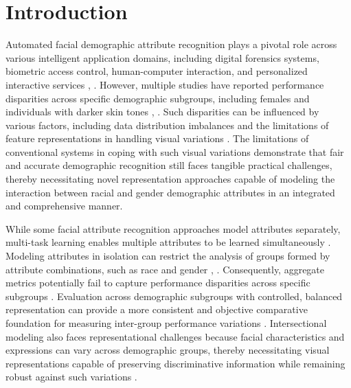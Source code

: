 \section{Introduction}
\label{sec:introduction}

Automated facial demographic attribute recognition plays a pivotal role across various intelligent application domains, including digital forensics systems, biometric access control, human-computer interaction, and personalized interactive services \cite{ref1}, \cite{ref2}. However, multiple studies have reported performance disparities across specific demographic subgroups, including females and individuals with darker skin tones \cite{ref3}, \cite{ref4}. Such disparities can be influenced by various factors, including data distribution imbalances and the limitations of feature representations in handling visual variations \cite{ref5}. The limitations of conventional systems in coping with such visual variations demonstrate that fair and accurate demographic recognition still faces tangible practical challenges, thereby necessitating novel representation approaches capable of modeling the interaction between racial and gender demographic attributes in an integrated and comprehensive manner.

While some facial attribute recognition approaches model attributes separately, multi-task learning enables multiple attributes to be learned simultaneously \cite{ref6}. Modeling attributes in isolation can restrict the analysis of groups formed by attribute combinations, such as race and gender \cite{ref7}, \cite{ref8}. Consequently, aggregate metrics potentially fail to capture performance disparities across specific subgroups \cite{ref9}. Evaluation across demographic subgroups with controlled, balanced representation can provide a more consistent and objective comparative foundation for measuring inter-group performance variations \cite{ref9}. Intersectional modeling also faces representational challenges because facial characteristics and expressions can vary across demographic groups, thereby necessitating visual representations capable of preserving discriminative information while remaining robust against such variations \cite{ref10}.

